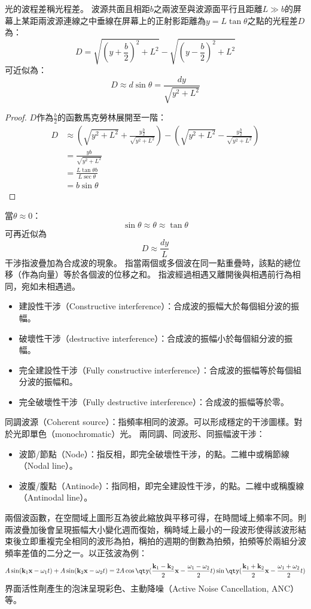 \documentclass[a4paper,12pt]{report}
\begin{document}
光的波程差稱光程差。
波源共面且相距$b$之兩波至與波源面平行且距離$L\gg b$的屏幕上某距兩波源連線之中垂線在屏幕上的正射影距離為$y=L\tan\theta$之點的光程差$D$為：
\[D = \sqrt{\left(y + \frac{b}{2}\right)^2 + L^2} - \sqrt{\left(y - \frac{b}{2}\right)^2 + L^2}\]
可近似為：
\[D\approx d\sin\theta=\frac{dy}{\sqrt{y^2+L^2}}\]
\begin{proof}
$D$作為$\frac{b}{2}$的函數馬克勞林展開至一階：
\[\begin{aligned}
D &\approx \left(\sqrt{y^2 + L^2} + \frac{y\frac{b}{2}}{\sqrt{y^2 + L^2}}\right) - \left(\sqrt{y^2 + L^2} - \frac{y\frac{b}{2}}{\sqrt{y^2 + L^2}}\right)\\
&= \frac{yb}{\sqrt{y^2 + L^2}}\\
&= \frac{L\tan\theta b}{L\sec\theta}\\
&= b\sin\theta
\end{aligned}\]
\end{proof}
當$\theta\approx 0$：
\[\sin\theta\approx\theta\approx\tan\theta\]
可再近似為
\[D\approx\frac{dy}{L}\]
干涉指波疊加為合成波的現象。
指當兩個或多個波在同一點重疊時，該點的總位移（作為向量）等於各個波的位移之和。
指波經過相遇又離開後與相遇前行為相同，宛如未相遇過。
\begin{itemize}
\item 建設性干涉（Constructive interference）：合成波的振幅大於每個組分波的振幅。
\item 破壞性干涉（destructive interference）：合成波的振幅小於每個組分波的振幅。
\item 完全建設性干涉（Fully constructive interference）：合成波的振幅等於每個組分波的振幅和。
\item 完全破壞性干涉（Fully destructive interference）：合成波的振幅等於零。
\end{itemize}
同調波源（Coherent source）：指頻率相同的波源。可以形成穩定的干涉圖樣。對於光即單色（monochromatic）光。
兩同調、同波形、同振幅波干涉：
\begin{itemize}
\item 波節/節點（Node）：指反相，即完全破壞性干涉，的點。二維中或稱節線（Nodal line）。
\item 波腹/腹點（Antinode）：指同相，即完全建設性干涉，的點。二維中或稱腹線（Antinodal line）。
\end{itemize}
兩個波函數，在空間域上圖形互為彼此縮放與平移可得，在時間域上頻率不同。則兩波疊加後會呈現振幅大小變化週而復始，稱時域上最小的一段波形使得該波形結束後立即重複完全相同的波形為拍，稱拍的週期的倒數為拍頻，拍頻等於兩組分波頻率差值的二分之一。以正弦波為例：
\[A\sin(\mathbf{k}_1\mathbf{x}-\omega_1 t)+A\sin(\mathbf{k}_2\mathbf{x}-\omega_2 t)=2A\cos\qty(\frac{\mathbf{k}_1-\mathbf{k}_2}{2}\mathbf{x}-\frac{\omega_1-\omega_2}{2}t)\sin\qty(\frac{\mathbf{k}_1+\mathbf{k}_2}{2}\mathbf{x}-\frac{\omega_1+\omega_2}{2}t)\]
界面活性劑產生的泡沫呈現彩色、主動降噪（Active Noise Cancellation, ANC）等。
\end{document}
